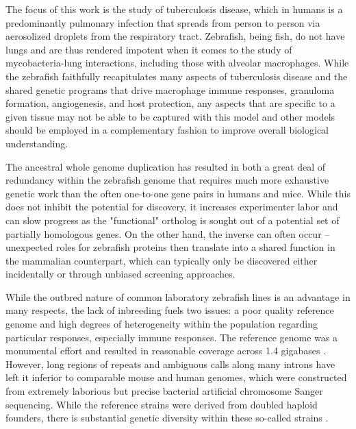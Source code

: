The focus of this work is the study of tuberculosis disease, which in humans is a predominantly pulmonary infection that spreads from person to person via aerosolized droplets from the respiratory tract. Zebrafish, being fish, do not have lungs and are thus rendered impotent when it comes to the study of mycobacteria-lung interactions, including those with alveolar macrophages. While the zebrafish faithfully recapitulates many aspects of tuberculosis disease and the shared genetic programs that drive macrophage immune responses, granuloma formation, angiogenesis, and host protection, any aspects that are specific to a given tissue may not be able to be captured with this model and other models should be employed in a complementary fashion to improve overall biological understanding. 

The ancestral whole genome duplication has resulted in both a great deal of redundancy within the zebrafish genome that requires much more exhaustive genetic work than the often one-to-one gene pairs in humans and mice. While this does not inhibit the potential for discovery, it increases experimenter labor and can slow progress as the "functional" ortholog is sought out of a potential set of partially homologous genes. On the other hand, the inverse can often occur -- unexpected roles for zebrafish proteins then translate into a shared function in the mammalian counterpart, which can typically only be discovered either incidentally or through unbiased screening approaches.

While the outbred nature of common laboratory zebrafish lines is an advantage in many respects, the lack of inbreeding fuels two issues: a poor quality reference genome and high degrees of heterogeneity within the population regarding particular responses, especially immune responses. The reference genome was a monumental effort and resulted in reasonable coverage across 1.4 gigabases \citep{Howe2013}. However, long regions of repeats and ambiguous calls along many introns have left it inferior to comparable mouse and human genomes, which were constructed from extremely laborious but precise bacterial artificial chromosome Sanger sequencing. While the reference strains were derived from doubled haploid founders, there is substantial genetic diversity within these so-called strains \citep{Suurvali2020, Holden2018}. 

